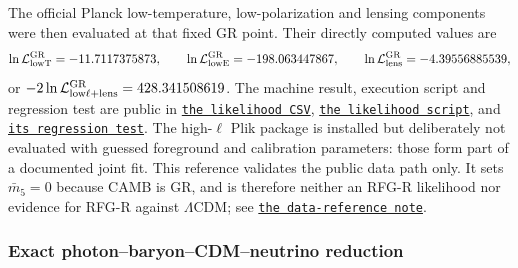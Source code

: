 \documentclass[11pt,a4paper]{article}
\newcommand{\RFGRepoURL}{https://github.com/MartinPetrasek123/MartinPetrasek123}
\newcommand{\RFGRepoNamed}[2]{\href{\RFGRepoURL/blob/main/r-universe-complete-chain/rfg-r-completion/r\_universe\_completion/#1}{\texttt{#2}}}
\begin{document}
The official Planck low-temperature, low-polarization and lensing components
were then evaluated at that fixed GR point. Their directly computed values are
\begin{equation}
 \ln\mathcal L_{\rm lowT}^{\rm GR}=-11.7117375873,\qquad
 \ln\mathcal L_{\rm lowE}^{\rm GR}=-198.063447867,\qquad
 \ln\mathcal L_{\rm lens}^{\rm GR}=-4.39556885539,
 \label{eq:gr-planck-lowell-components}
\end{equation}
or \(-2\ln\mathcal L_{\rm low\ell+lens}^{\rm GR}=428.341508619\).
The machine result, execution script and regression test are public in
\RFGRepoNamed{generated/tables/gr\_planck\_2018\_lowell\_lensing.csv}{the likelihood CSV},
\RFGRepoNamed{scripts/gr\_planck\_lowell\_lensing.py}{the likelihood script}, and
\RFGRepoNamed{scripts/validate\_gr\_planck\_lowell\_lensing.py}{its regression test}.
The high-\(\ell\) Plik package is installed but deliberately not evaluated
with guessed foreground and calibration parameters: those form part of a
documented joint fit. This reference validates the public data path only. It
sets \(\bar m_5=0\) because CAMB is GR, and is therefore neither an RFG-R
likelihood nor evidence for RFG-R against \(\Lambda\)CDM; see
\RFGRepoNamed{docs/planck\_data\_reference.md}{the data-reference note}.

\subsubsection{Exact photon--baryon--CDM--neutrino reduction}
\label{sec:rfgr-multifluid-reduction}
\end{document}
